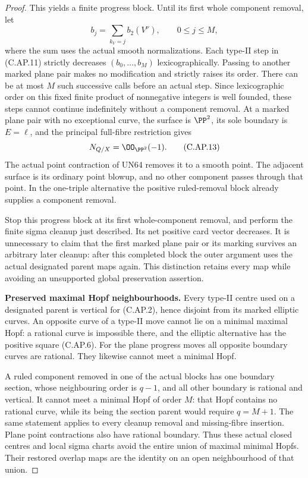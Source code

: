 \begin{proof}
This yields a finite progress block. Until its first whole
component removal, let
\[
                    b_j=\sum_{k_V=j}b_2(V^\nu),
                    \qquad 0\le j\le M,
 \tag{C.AP.12}
\]
where the sum uses the actual smooth normalizations. Each
type-II step in (C.AP.11) strictly decreases
\((b_0,\ldots,b_M)\) lexicographically. Passing to another
marked plane pair makes no modification and strictly raises
its order. There can be at most \(M\) such successive calls
before an actual step. Since lexicographic order on this
fixed finite product of nonnegative integers is well founded,
these steps cannot continue indefinitely without a component
removal. At a marked plane pair with no exceptional curve,
the surface is \(\PP^2\), its sole boundary is \(E=\ell\),
and the principal full-fibre restriction gives
\[
                 N_{Q/X}=\OO_{\PP^2}(-1).
 \tag{C.AP.13}
\]
The actual point contraction of UN64 removes it to a smooth
point. The adjacent surface is its ordinary point blowup,
and no other component passes through that point. In the
one-triple alternative the positive ruled-removal block
already supplies a component removal.

Stop this progress block at its first whole-component
removal, and perform the finite sigma cleanup just described.
Its net positive card vector decreases. It is unnecessary
to claim that the first marked plane pair or its marking
survives an arbitrary later cleanup: after this completed
block the outer argument uses the actual designated parent
maps again. This distinction retains every map while avoiding
an unsupported global preservation assertion.

\par\medskip\noindent\textbf{Preserved maximal Hopf neighbourhoods.}
Every type-II centre used on a designated parent is vertical
for (C.AP.2), hence disjoint from its marked elliptic curves.
An opposite curve of a type-II move cannot lie on a minimal
maximal Hopf: a rational curve is impossible there, and the
elliptic alternative has the positive square (C.AP.6).
For the plane progress moves all opposite boundary curves
are rational. They likewise cannot meet a minimal Hopf.

A ruled component removed in one of the actual blocks has
one boundary section, whose neighbouring order is \(q-1\),
and all other boundary is rational and vertical. It cannot
meet a minimal Hopf of order \(M\): that Hopf contains no
rational curve, while its being the section parent would
require \(q=M+1\). The same statement applies to every
cleanup removal and missing-fibre insertion. Plane point
contractions also have rational boundary. Thus these actual
closed centres and local sigma charts avoid the entire
union of maximal minimal Hopfs. Their restored overlap maps
are the identity on an open neighbourhood of that union.


\end{proof}
